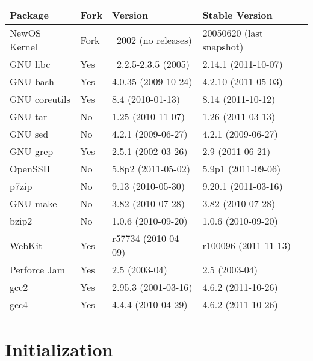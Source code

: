 \documentclass{article}
\begin{document}
\begin{tabular}{l l l l}
\toprule
Package & Fork & Version & Stable Version \\
\midrule
NewOS Kernel & Fork & ~2002 (no releases) & 20050620 (last snapshot) \\
\midrule
GNU libc & Yes & ~2.2.5-2.3.5 (2005) & 2.14.1 (2011-10-07) \\
\midrule
GNU bash & Yes & 4.0.35 (2009-10-24) & 4.2.10 (2011-05-03) \\
\midrule
GNU coreutils & Yes & 8.4 (2010-01-13) & 8.14 (2011-10-12) \\
\midrule
GNU tar & No & 1.25 (2010-11-07) & 1.26 (2011-03-13) \\
\midrule
GNU sed & No & 4.2.1 (2009-06-27) & 4.2.1 (2009-06-27) \\
\midrule
GNU grep & Yes & 2.5.1 (2002-03-26) & 2.9 (2011-06-21) \\
\midrule
OpenSSH & No & 5.8p2 (2011-05-02) & 5.9p1 (2011-09-06) \\
\midrule
p7zip & No & 9.13 (2010-05-30) & 9.20.1 (2011-03-16) \\
\midrule
GNU make & No & 3.82 (2010-07-28) & 3.82 (2010-07-28) \\
\midrule
bzip2 & No & 1.0.6 (2010-09-20) & 1.0.6 (2010-09-20) \\
\midrule
WebKit & Yes & r57734 (2010-04-09) & r100096 (2011-11-13) \\
\midrule
Perforce Jam & Yes & 2.5 (2003-04) & 2.5 (2003-04) \\
\midrule
gcc2 & Yes & 2.95.3 (2001-03-16) & 4.6.2 (2011-10-26) \\
\midrule
gcc4 & Yes & 4.4.4 (2010-04-29) & 4.6.2 (2011-10-26) \\
\bottomrule
\end{tabular}

\section{Initialization}

{}

\end{document}
